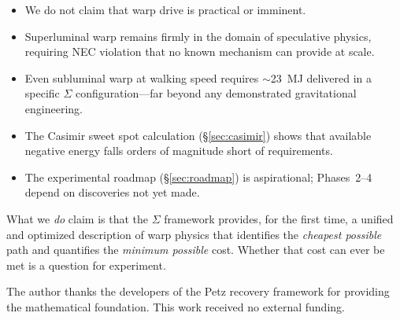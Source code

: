\documentclass[prd,twocolumn,superscriptaddress,longbibliography]{revtex4-2}
\begin{document}
\begin{itemize}
\item We do not claim that warp drive is practical or imminent.
\item Superluminal warp remains firmly in the domain of
speculative physics, requiring NEC violation that no known
mechanism can provide at scale.
\item Even subluminal warp at walking speed requires $\sim$23~MJ
delivered in a specific $\Sigma$ configuration---far beyond
any demonstrated gravitational engineering.
\item The Casimir sweet spot calculation (\S\ref{sec:casimir})
shows that available negative energy falls orders of magnitude
short of requirements.
\item The experimental roadmap (\S\ref{sec:roadmap}) is
aspirational; Phases~2--4 depend on discoveries not yet made.
\end{itemize}

What we \emph{do} claim is that the $\Sigma$ framework provides,
for the first time, a unified and optimized description of warp
physics that identifies the \emph{cheapest possible} path and
quantifies the \emph{minimum possible} cost.  Whether that cost
can ever be met is a question for experiment.

\begin{acknowledgments}
The author thanks the developers of the Petz recovery framework
for providing the mathematical foundation.  This work received
no external funding.
\end{acknowledgments}
\end{document}
